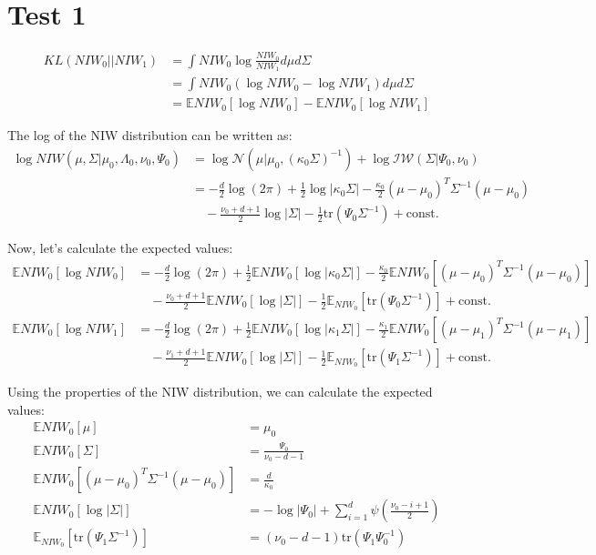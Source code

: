\documentclass[11pt]{article}
\begin{document}
    \section{Test 1}
    \begin{align*}
        KL(NIW_0 || NIW_1) &= \int NIW_0 \log \frac{NIW_0}{NIW_1} d\mu d\Sigma \\
        &= \int NIW_0 (\log NIW_0 - \log NIW_1) d\mu d\Sigma \\
        &= \mathbb{E}{NIW_0}[\log NIW_0] - \mathbb{E}{NIW_0}[\log NIW_1]
    \end{align*}

    The log of the NIW distribution can be written as:
    \begin{align*}
        \log NIW(\mu, \Sigma | \mu_0, \Lambda_0, \nu_0, \Psi_0) &= \log \mathcal{N}(\mu | \mu_0, (\kappa_0 \Sigma)^{-1}) + \log \mathcal{IW}(\Sigma | \Psi_0, \nu_0) \\
        &= -\frac{d}{2} \log(2\pi) + \frac{1}{2} \log |\kappa_0 \Sigma| - \frac{\kappa_0}{2} (\mu - \mu_0)^T \Sigma^{-1} (\mu - \mu_0) \\
        &\quad - \frac{\nu_0 + d + 1}{2} \log |\Sigma| - \frac{1}{2} \text{tr}(\Psi_0 \Sigma^{-1}) + \text{const.}
    \end{align*}

    Now, let's calculate the expected values:
    \begin{align*}
        \mathbb{E}{NIW_0}[\log NIW_0] &= -\frac{d}{2} \log(2\pi) + \frac{1}{2} \mathbb{E}{NIW_0}[\log |\kappa_0 \Sigma|] - \frac{\kappa_0}{2} \mathbb{E}{NIW_0}[(\mu - \mu_0)^T \Sigma^{-1} (\mu - \mu_0)] \\
        &\quad - \frac{\nu_0 + d + 1}{2} \mathbb{E}{NIW_0}[\log |\Sigma|] - \frac{1}{2} \mathbb{E}_{NIW_0}[\text{tr}(\Psi_0 \Sigma^{-1})] + \text{const.} \\
        \mathbb{E}{NIW_0}[\log NIW_1] &= -\frac{d}{2} \log(2\pi) + \frac{1}{2} \mathbb{E}{NIW_0}[\log |\kappa_1 \Sigma|] - \frac{\kappa_1}{2} \mathbb{E}{NIW_0}[(\mu - \mu_1)^T \Sigma^{-1} (\mu - \mu_1)] \\
        &\quad - \frac{\nu_1 + d + 1}{2} \mathbb{E}{NIW_0}[\log |\Sigma|] - \frac{1}{2} \mathbb{E}_{NIW_0}[\text{tr}(\Psi_1 \Sigma^{-1})] + \text{const.}
    \end{align*}

    Using the properties of the NIW distribution, we can calculate the expected values:
    \begin{align*}
        \mathbb{E}{NIW_0}[\mu] &= \mu_0 \\
        \mathbb{E}{NIW_0}[\Sigma] &= \frac{\Psi_0}{\nu_0 - d - 1} \\
        \mathbb{E}{NIW_0}[(\mu - \mu_0)^T \Sigma^{-1} (\mu - \mu_0)] &= \frac{d}{\kappa_0} \\
        \mathbb{E}{NIW_0}[\log |\Sigma|] &= -\log |\Psi_0| + \sum_{i=1}^d \psi\left(\frac{\nu_0 - i + 1}{2}\right) \\
        \mathbb{E}_{NIW_0}[\text{tr}(\Psi_1 \Sigma^{-1})] &= (\nu_0 - d - 1) \text{tr}(\Psi_1 \Psi_0^{-1})
    \end{align*}
\end{document}
